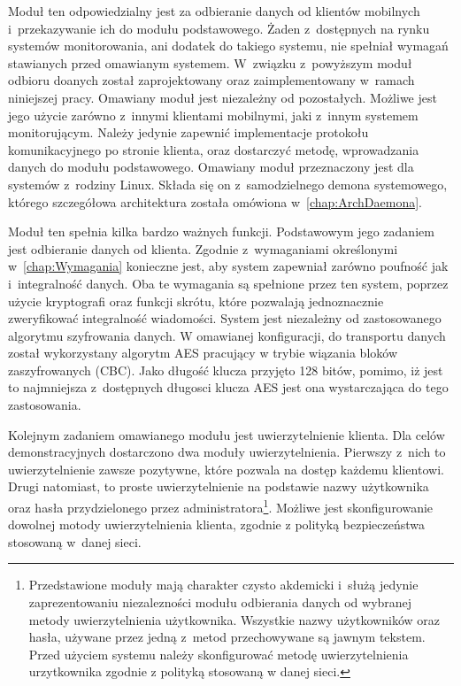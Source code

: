 Moduł ten odpowiedzialny jest za odbieranie danych od klientów
mobilnych i~przekazywanie ich do modułu podstawowego. Żaden
z~dostępnych na rynku systemów monitorowania, ani dodatek do takiego
systemu, nie spełniał wymagań stawianych przed omawianym
systemem. W~związku z~powyższym moduł odbioru doanych został
zaprojektowany oraz zaimplementowany w~ramach niniejszej
pracy. Omawiany moduł jest niezależny od pozostałych. Możliwe jest
jego użycie zarówno z~innymi klientami mobilnymi, jaki z~innym
systemem monitorującym. Należy jedynie zapewnić implementacje
protokołu komunikacyjnego po stronie klienta, oraz dostarczyć metodę,
wprowadzania danych do modułu podstawowego. Omawiany moduł
przeznaczony jest dla systemów z~rodziny Linux. Składa się on
z~samodzielnego demona systemowego, którego szczegółowa architektura
została omówiona w~\ref{chap:ArchDaemona}.

Moduł ten spełnia kilka bardzo ważnych funkcji. Podstawowym jego
zadaniem jest odbieranie danych od klienta. Zgodnie z~wymaganiami
określonymi w~\ref{chap:Wymagania} konieczne jest, aby system
zapewniał zarówno poufność jak i~integralność danych. Oba te wymagania
są spełnione przez ten system, poprzez użycie kryptografi oraz funkcji
skrótu, które pozwalają jednoznacznie zweryfikować integralność
wiadomości. System jest niezależny od zastosowanego algorytmu
szyfrowania danych. W omawianej konfiguracji, do transportu danych
został wykorzystany algorytm AES pracujący w trybie wiązania bloków
zaszyfrowanych (CBC). Jako długość klucza przyjęto 128 bitów, pomimo,
iż jest to najmniejsza z~dostępnych długosci klucza AES jest ona
wystarczająca do tego zastosowania.

Kolejnym zadaniem omawianego modułu jest uwierzytelnienie klienta. Dla
celów demonstracyjnych dostarczono dwa moduły
uwierzytelnienia. Pierwszy z~nich to uwierzytelnienie zawsze
pozytywne, które pozwala na dostęp każdemu klientowi. Drugi natomiast,
to proste uwierzytelnienie na podstawie nazwy użytkownika oraz hasła
przydzielonego przez administratora\footnote{Przedstawione moduły mają
  charakter czysto akdemicki i~służą jedynie zaprezentowaniu
  niezalezności modułu odbierania danych od wybranej metody
  uwierzytelnienia użytkownika. Wszystkie nazwy użytkowników oraz
  hasła, używane przez jedną z~metod przechowywane są jawnym
  tekstem. Przed użyciem systemu należy skonfigurować metodę
  uwierzytelnienia urzytkownika zgodnie z polityką stosowaną w danej
  sieci.}. Możliwe jest skonfigurowanie dowolnej motody
uwierzytelnienia klienta, zgodnie z polityką bezpieczeństwa stosowaną
w~danej sieci.

